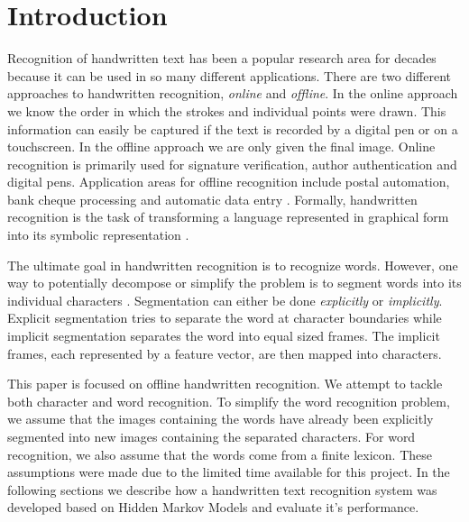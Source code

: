 \section{Introduction}

Recognition of handwritten text has been a popular research area for decades because it can be used in so many different applications. %
There are two different approaches to handwritten recognition, \textit{online} and \textit{offline}.
In the online approach we know the order in which the strokes and individual points were drawn.
This information can easily be captured if the text is recorded by a digital pen or on a touchscreen.
In the offline approach we are only given the final image.
Online recognition is primarily used for signature verification, author authentication and digital pens.
Application areas for offline recognition include postal automation, bank cheque processing and automatic data entry \cite{intro1}.
Formally, handwritten recognition is the task of transforming a language represented in graphical form into its symbolic representation \cite{introsurvey}.

The ultimate goal in handwritten recognition is to recognize words.
However, one way to potentially decompose or simplify the problem is to segment words into its individual characters \cite{intro-Yacoubi}. 
Segmentation can either be done \textit{explicitly} or \textit{implicitly}.
Explicit segmentation tries to separate the word at character boundaries while implicit segmentation separates the word into equal sized frames.
The implicit frames, each represented by a feature vector, are then mapped into characters.

This paper is focused on offline handwritten recognition.
We attempt to tackle both character and word recognition.
To simplify the word recognition problem, we assume that the images containing the words have already been explicitly segmented into new images containing the separated characters.
For word recognition, we also assume that the words come from a finite lexicon.
These assumptions were made due to the limited time available for this project.
In the following sections we describe how a handwritten text recognition system was developed based on Hidden Markov Models and evaluate it's performance.

